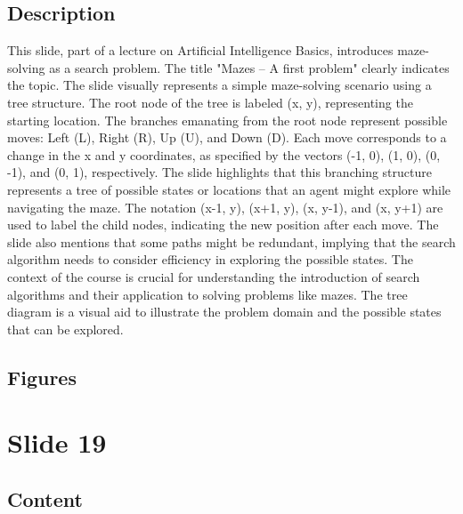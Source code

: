 \documentclass{article}%
\begin{document}
\subsection{Description}%
This slide, part of a lecture on Artificial Intelligence Basics, introduces maze-solving as a search problem.  The title "Mazes – A first problem" clearly indicates the topic.  The slide visually represents a simple maze-solving scenario using a tree structure.  The root node of the tree is labeled (x, y), representing the starting location.  The branches emanating from the root node represent possible moves: Left (L), Right (R), Up (U), and Down (D).  Each move corresponds to a change in the x and y coordinates, as specified by the vectors (-1, 0), (1, 0), (0, -1), and (0, 1), respectively.  The slide highlights that this branching structure represents a tree of possible states or locations that an agent might explore while navigating the maze.  The notation (x-1, y), (x+1, y), (x, y-1), and (x, y+1) are used to label the child nodes, indicating the new position after each move.  The slide also mentions that some paths might be redundant, implying that the search algorithm needs to consider efficiency in exploring the possible states.  The context of the course is crucial for understanding the introduction of search algorithms and their application to solving problems like mazes. The tree diagram is a visual aid to illustrate the problem domain and the possible states that can be explored.%
\subsection{Figures}%
\begin{figure}[H]%
\centering%
\end{figure}

%
\newpage%
\section{Slide 19}%
\label{sec:Slide19}%
\subsection{Content}%
\end{document}
